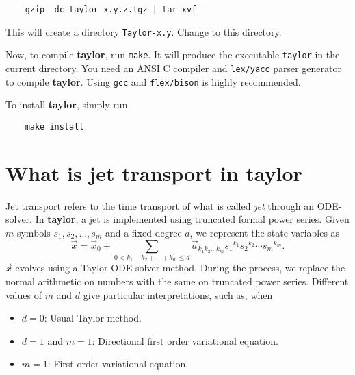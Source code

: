 \documentclass[10pt]{article}
\theoremstyle{remark}
\newcommand{\taylorname}{{\bf taylor}}
\begin{document}
\begin{verbatim}
    gzip -dc taylor-x.y.z.tgz | tar xvf - 
\end{verbatim}

\noindent
This will create a directory {\tt Taylor-x.y}.  Change to this
directory.

Now, to compile \taylorname{}, run {\tt make}.  It will produce the
executable {\tt taylor} in the current directory.  You need an ANSI C
compiler and {\tt lex/yacc} parser generator to compile
\taylorname{}. Using {\tt gcc} and {\tt flex/bison} is highly
recommended.

To install \taylorname{}, simply run
\begin{verbatim}
    make install 
\end{verbatim}



\section{What is jet transport in \taylorname{}} \label{sec:jettransport}
Jet transport refers to the time transport of what is called {\em jet}
through an ODE-solver. In \taylorname{}, a jet is implemented using
truncated formal power series. Given $m$ symbols $s_1, s_2, \ldots,
s_m$ and a fixed degree $d$, we represent the state variables as
\begin{equation}
    {\vec x} = {\vec x}_0+\sum_{0<k_1+k_2+\cdots+k_m \leq d} {\vec
      a}_{k_1k_2...k_m}{s_1}^{k_1}{s_2}^{k_2}\cdots{s_m}^{k_m}.
\end{equation}
$\vec x$ evolves using a Taylor ODE-solver method. During the process,
we replace the normal arithmetic on numbers with the same on truncated
power series. Different values of $m$ and $d$ give particular
interpretations, such as, when
\begin{itemize}
    \item $d = 0$: Usual Taylor method.
    \item $d=1$ and $m=1$: Directional first order variational equation.
    \item $m=1$: First order variational equation.
\end{itemize}
\end{document}
